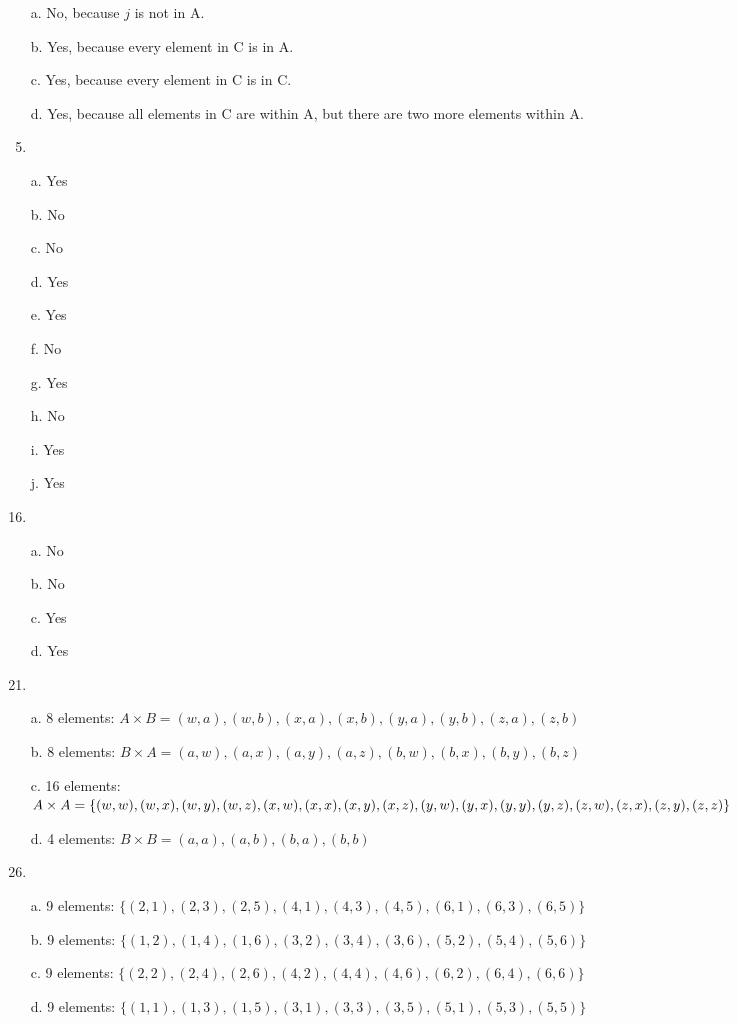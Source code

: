 \documentclass{article}
\begin{document}
\begin{enumerate}[label=\textbf{\arabic*.}]
\item[a.] No, because $j$ is not in A.
\item[b.] Yes, because every element in C is in A.
\item[c.] Yes, because every element in C is in C.
\item[d.] Yes, because all elements in C are within A, but there are two more elements within A. 
\item %
\item[a.] Yes
\item[b.] No
\item[c.] No
\item[d.] Yes
\item[e.] Yes
\item[f.] No
\item[g.] Yes
\item[h.] No
\item[i.] Yes
\item[j.] Yes
\item %
\item[a.] No
\item[b.] No
\item[c.] Yes
\item[d.] Yes
\item %
\item[a.] 8 elements: $A \times B = {(w,a),(w,b),(x,a),(x,b),(y,a),(y,b),(z,a),(z,b)}$
\item[b.] 8 elements: $B \times A = {(a,w),(a,x),(a,y),(a,z),(b,w),(b,x),(b,y),(b,z)}$
\item[c.] 16 elements: \\
$A \times A = \{(w,w), (w,x), (w,y), (w,z),\\
(x,w), (x,x), (x,y), (x,z),\\
(y,w), (y,x), (y,y), (y,z),\\
(z,w), (z,x), (z,y), (z,z)\}$
\item[d.] 4 elements: $B \times B = {(a,a),(a,b),(b,a),(b,b)}$
\item %
\item[a.] 9 elements: $\{(2,1),(2,3),(2,5),(4,1),(4,3),(4,5),(6,1),(6,3),(6,5)\}$
\item[b.] 9 elements: $\{(1,2),(1,4),(1,6),(3,2),(3,4),(3,6),(5,2),(5,4),(5,6)\}$
\item[c.] 9 elements: $\{(2,2),(2,4),(2,6),(4,2),(4,4),(4,6),(6,2),(6,4),(6,6)\}$
\item[d.] 9 elements: $\{(1,1),(1,3),(1,5),(3,1),(3,3),(3,5),(5,1),(5,3),(5,5)\}$

\end{enumerate}
\end{document}
